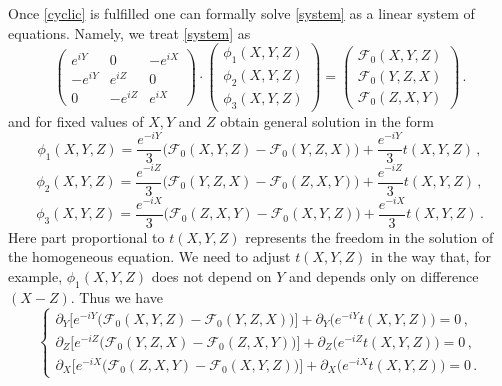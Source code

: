 \documentclass[12pt]{article}
\begin{document}
Once \eqref{cyclic} is fulfilled one can formally solve \eqref{system} as a linear system of equations. Namely, we treat \eqref{system} as 
\begin{equation}\label{system2}
\left(\begin{matrix}
e^{iY} & 0 & -e^{iX} \\
-e^{iY} & e^{iZ} & 0\\
0 & -e^{iZ} & e^{iX}
\end{matrix}\right)\cdot \left(\begin{matrix}
\phi_1(X,Y,Z)\\
\phi_2(X,Y,Z)\\
\phi_3(X,Y,Z)
\end{matrix}\right)=\left(\begin{matrix}
\mathscr{F}_0(X,Y,Z)\\
\mathscr{F}_0 (Y,Z,X)\\
\mathscr{F}_0 (Z,X,Y)
\end{matrix}\right)\,.
\end{equation}
and for fixed values of $X,Y$ and $Z$ obtain general solution in the form
\begin{equation}\label{phi_1}
\phi_1(X,Y,Z)=\frac{e^{-iY}}{3}\big(\mathscr{F}_0(X,Y,Z)-\mathscr{F}_0(Y,Z,X)\big)+\frac{e^{-iY}}{3}t(X,Y,Z)\,,
\end{equation}
\begin{equation}
\phi_2(X,Y,Z)=\frac{e^{-iZ}}{3}\big(\mathscr{F}_0(Y,Z,X)-\mathscr{F}_0(Z,X,Y)\big)+\frac{e^{-iZ}}{3}t(X,Y,Z)\,,
\end{equation}
\begin{equation}
\phi_3(X,Y,Z)=\frac{e^{-iX}}{3}\big(\mathscr{F}_0(Z,X,Y)-\mathscr{F}_0(X,Y,Z)\big)+\frac{e^{-iX}}{3}t(X,Y,Z)\,.
\end{equation}
Here part proportional to $t(X,Y,Z)$ represents the freedom in the solution of the homogeneous equation. We need to adjust $t(X,Y,Z)$ in the way that, for example, $\phi_1(X,Y,Z)$ does not depend on $Y$ and depends only on difference $(X-Z)$. Thus we have
\begin{equation}
\begin{cases}
\partial_Y\big[e^{-iY}\big(\mathscr{F}_0(X,Y,Z)-\mathscr{F}_0(Y,Z,X)\big)\big]+\partial_Y \big(e^{-iY}t(X,Y,Z)\big)=0\,,\\
\partial_Z\big[e^{-iZ}\big(\mathscr{F}_0(Y,Z,X)-\mathscr{F}_0(Z,X,Y)\big)\big]+\partial_Z\big(e^{-iZ}t(X,Y,Z)\big)=0\,,\\
\partial_X\big[e^{-iX}\big(\mathscr{F}_0(Z,X,Y)-\mathscr{F}_0(X,Y,Z)\big)\big]+
\partial_X\big(e^{-iX}t(X,Y,Z)\big)=0\,.
\end{cases}
\end{equation} 
\end{document}
